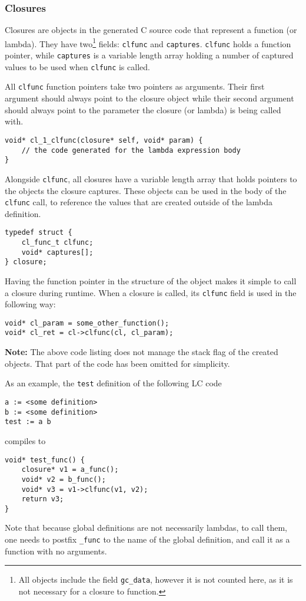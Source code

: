 \documentclass[12pt]{article}
\begin{document}
\subsubsection{Closures}

Closures are objects in the generated C source code that represent a function
(or lambda). They have two\footnote{All objects include the field
\texttt{gc\_data}, however it is not counted here, as it is not necessary for a
closure to function.} fields: \verb$clfunc$ and \verb$captures$. \verb$clfunc$
holds a function pointer, while \verb$captures$ is a variable length array
holding a number of captured values to be used when \verb$clfunc$ is called.

All \verb$clfunc$ function pointers take two pointers as arguments. Their first
argument should always point to the closure object while their second argument
should always point to the parameter the closure (or lambda) is being called
with.
\vspace{1em}
\\\noindent\begin{minipage}{\textwidth}
\begin{lstlisting}
void* cl_1_clfunc(closure* self, void* param) {
    // the code generated for the lambda expression body
}
\end{lstlisting}
\end{minipage}

Alongside \verb$clfunc$, all closures have a variable length array that holds
pointers to the objects the closure captures. These objects can be used in the
body of the \verb$clfunc$ call, to reference the values that are created outside
of the lambda definition.

\begin{lstlisting}
typedef struct {
    cl_func_t clfunc;
    void* captures[];
} closure;
\end{lstlisting}

Having the function pointer in the structure of the object makes it simple to
call a closure during runtime. When a closure is called, its \verb$clfunc$ field
is used in the following way:
\begin{lstlisting}
void* cl_param = some_other_function();
void* cl_ret = cl->clfunc(cl, cl_param); 
\end{lstlisting}
\textbf{Note:} The above code listing does not manage the stack flag of the
created objects. That part of the code has been omitted for simplicity.

As an example, the \verb$test$ definition of the following LC code
\begin{lstlisting}
a := <some definition>
b := <some definition>
test := a b
\end{lstlisting}
compiles to
\begin{lstlisting}
void* test_func() {
    closure* v1 = a_func();
    void* v2 = b_func();
    void* v3 = v1->clfunc(v1, v2);
    return v3;
}
\end{lstlisting}
Note that because global definitions are not necessarily lambdas, to call them,
one needs to postfix \verb$_func$ to the name of the global definition, and call
it as a function with no arguments.
\end{document}
